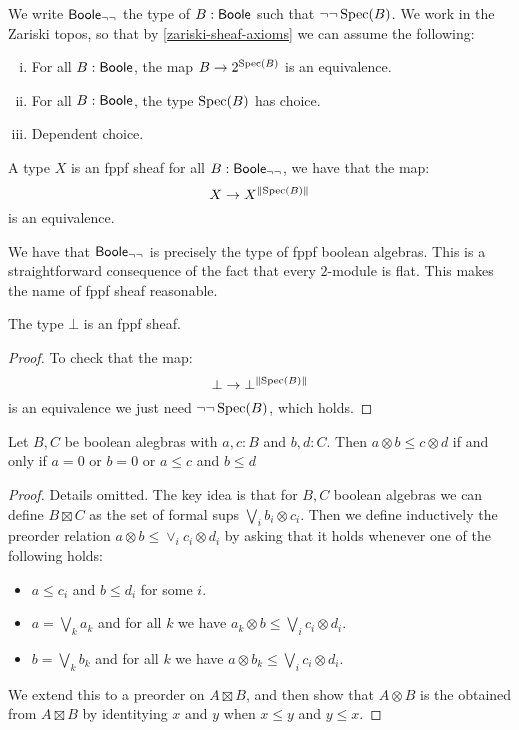 
We write $\mathsf{Boole}_{\neg\neg}$ the type of $B:\mathsf{Boole}$ such that $\neg\neg\operatorname{Spec}(B)$. We work in the Zariski topos, so that by \cref{zariski-sheaf-axioms} we can assume the following:

\begin{enumerate}[(i)]
\item For all $B:\mathsf{Boole}$, the map $B\to {2}^{\operatorname{Spec}(B)}$ is an equivalence.
\item For all $B:\mathsf{Boole}$, the type $\operatorname{Spec}(B)$ has choice.
\item Dependent choice.
\end{enumerate}

\begin{definition}
A type $X$ is an fppf sheaf for all $B:\mathsf{Boole}_{\neg\neg}$, we have that the map:
\[X\to X^{\lVert \operatorname{Spec}(B) \rVert}\]
is an equivalence.
\end{definition}

\begin{remark}
We have that $\mathsf{Boole}_{\neg\neg}$ is precisely the type of fppf boolean algebras. This is a straightforward consequence of the fact that every ${2}$-module is flat. This makes the name of fppf sheaf reasonable.
\end{remark}

\begin{lemma}\label{bot-sheaf}
The type $\bot$ is an fppf sheaf.
\end{lemma}

\begin{proof}
To check that the map:
\[\bot\to \bot^{\lVert \operatorname{Spec}(B) \rVert}\]
is an equivalence we just need $\neg\neg\operatorname{Spec}(B)$, which holds.
\end{proof}

\begin{lemma}\label{tensor-boolean-algebras}
Let $B,C$ be boolean alegbras with $a,c:B$ and $b,d:C$. Then $a\otimes b\leq c\otimes d$ if and only if $a=0$ or $b=0$ or $a\leq c$ and $b\leq d$
\end{lemma}

\begin{proof}
Details omitted. The key idea is that for $B,C$ boolean algebras we can define $B\boxtimes C$ as the set of formal sups $\bigvee_ib_i\otimes c_i$. Then we define inductively the preorder relation $a\otimes b\leq \lor_ic_i\otimes d_i$ by asking that it holds whenever one of the following holds:
\begin{itemize}
\item $a\leq c_i$ and $b\leq d_i$ for some $i$.
\item $a=\bigvee_k a_k$ and for all $k$ we have $a_k\otimes b\leq \bigvee_ic_i\otimes d_i$.
\item $b=\bigvee_k b_k$ and for all $k$ we have $a\otimes b_k\leq \bigvee_ic_i\otimes d_i$.
\end{itemize}
We extend this to a preorder on $A\boxtimes B$, and then show that $A\otimes B$ is the obtained from $A\boxtimes B$ by identitying $x$ and $y$ when $x\leq y$ and $y\leq x$.
\end{proof}

